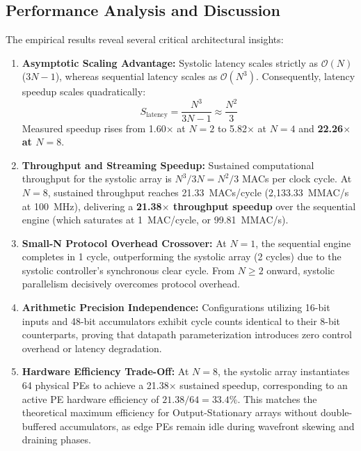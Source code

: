 \documentclass[conference]{IEEEtran}
\begin{document}
\subsection{Performance Analysis and Discussion}
The empirical results reveal several critical architectural insights:
\begin{enumerate}
    \item \textbf{Asymptotic Scaling Advantage:} Systolic latency scales strictly as $\mathcal{O}(N)$ ($3N-1$), whereas sequential latency scales as $\mathcal{O}(N^3)$. Consequently, latency speedup scales quadratically:
    \begin{equation}
    S_{\text{latency}} = \frac{N^3}{3N - 1} \approx \frac{N^2}{3}
    \end{equation}
    Measured speedup rises from 1.60$\times$ at $N=2$ to 5.82$\times$ at $N=4$ and \textbf{22.26$\times$ at $N=8$}.
    \item \textbf{Throughput and Streaming Speedup:} Sustained computational throughput for the systolic array is $N^3 / 3N = N^2/3$ MACs per clock cycle. At $N=8$, sustained throughput reaches 21.33~MACs/cycle (2,133.33~MMAC/s at 100~MHz), delivering a \textbf{21.38$\times$ throughput speedup} over the sequential engine (which saturates at 1~MAC/cycle, or 99.81~MMAC/s).
    \item \textbf{Small-N Protocol Overhead Crossover:} At $N=1$, the sequential engine completes in 1 cycle, outperforming the systolic array (2 cycles) due to the systolic controller's synchronous clear cycle. From $N \ge 2$ onward, systolic parallelism decisively overcomes protocol overhead.
    \item \textbf{Arithmetic Precision Independence:} Configurations utilizing 16-bit inputs and 48-bit accumulators exhibit cycle counts identical to their 8-bit counterparts, proving that datapath parameterization introduces zero control overhead or latency degradation.
    \item \textbf{Hardware Efficiency Trade-Off:} At $N=8$, the systolic array instantiates 64 physical PEs to achieve a 21.38$\times$ sustained speedup, corresponding to an active PE hardware efficiency of $21.38 / 64 = 33.4\%$. This matches the theoretical maximum efficiency for Output-Stationary arrays without double-buffered accumulators, as edge PEs remain idle during wavefront skewing and draining phases.
\end{enumerate}
\end{document}
